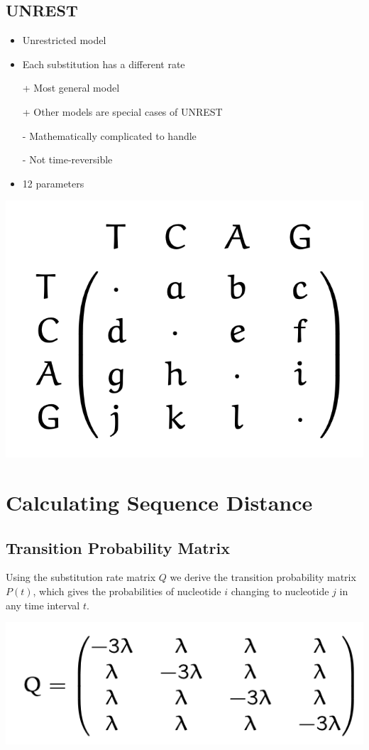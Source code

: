 \documentclass{article}
\begin{document}
\begin{multicols*}{3}
\subsection{UNREST}

\begin{itemize}
    \item Unrestricted model 
    \item Each substitution has a different rate
    \item[+] Most general model 
    \item[+] Other models are special cases of UNREST
    \item[-] Mathematically complicated to handle
    \item[-] Not time-reversible
    \item 12 parameters 
\end{itemize}

\begin{center}
    \includegraphics[width=0.5\linewidth]{unrest.png}
\end{center}

\section{Calculating Sequence Distance}
\subsection{Transition Probability Matrix}
\label{transprobmat}

Using the substitution rate matrix $Q$ we derive the transition probability matrix $P(t)$, which gives the probabilities of nucleotide $i$ changing to nucleotide $j$ in any time interval $t$.

\begin{center}
    \includegraphics[width=0.5\linewidth]{substitutionratematrix.png}
\end{center}


\end{multicols*}
\end{document}
